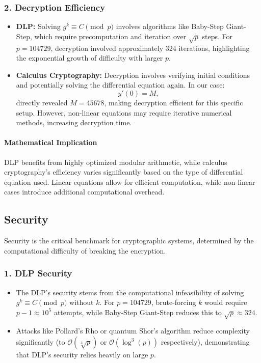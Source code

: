 \documentclass[12pt]{article}
\begin{document}
\subsubsection*{2. Decryption Efficiency}
\begin{itemize}
    \item \textbf{DLP:} Solving \( g^k \equiv C \pmod{p} \) involves algorithms like Baby-Step Giant-Step, which require precomputation and iteration over \( \sqrt{p} \) steps. For \( p = 104729 \), decryption involved approximately 324 iterations, highlighting the exponential growth of difficulty with larger \( p \).
    \item \textbf{Calculus Cryptography:} Decryption involves verifying initial conditions and potentially solving the differential equation again. In our case:
    \[
    y'(0) = M,
    \]
    directly revealed \( M = 45678 \), making decryption efficient for this specific setup. However, non-linear equations may require iterative numerical methods, increasing decryption time.
\end{itemize}

\paragraph*{Mathematical Implication}
DLP benefits from highly optimized modular arithmetic, while calculus cryptography’s efficiency varies significantly based on the type of differential equation used. Linear equations allow for efficient computation, while non-linear cases introduce additional computational overhead.

\subsection*{Security}

Security is the critical benchmark for cryptographic systems, determined by the computational difficulty of breaking the encryption.

\subsubsection*{1. DLP Security}
\begin{itemize}
    \item The DLP's security stems from the computational infeasibility of solving \( g^k \equiv C \pmod{p} \) without \( k \). For \( p = 104729 \), brute-forcing \( k \) would require \( p - 1 \approx 10^5 \) attempts, while Baby-Step Giant-Step reduces this to \( \sqrt{p} \approx 324 \).
    \item Attacks like Pollard’s Rho or quantum Shor’s algorithm reduce complexity significantly (to \( \mathcal{O}(\sqrt[3]{p}) \) or \( \mathcal{O}(\log^3(p)) \) respectively), demonstrating that DLP’s security relies heavily on large \( p \).
\end{itemize}
\end{document}
